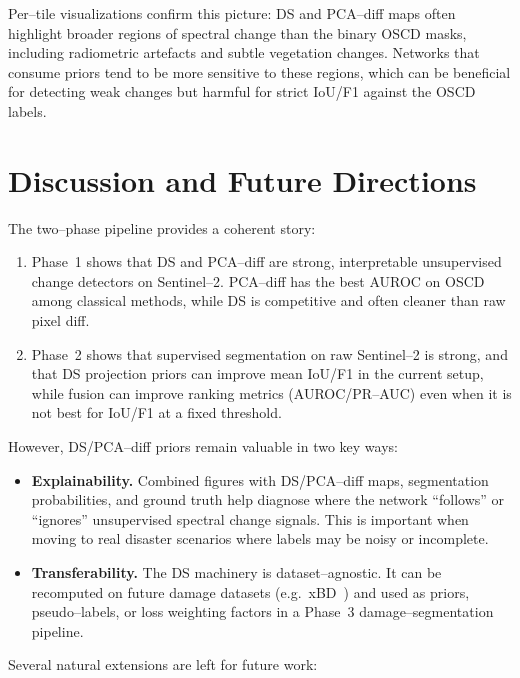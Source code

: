 \documentclass[twoside,11pt]{article}
\begin{document}
Per--tile visualizations confirm this picture: DS and PCA--diff maps often
highlight broader regions of spectral change than the binary OSCD masks,
including radiometric artefacts and subtle vegetation changes. Networks that
consume priors tend to be more sensitive to these regions, which can be
beneficial for detecting weak changes but harmful for strict IoU/F1 against
the OSCD labels.

\section{Discussion and Future Directions}

The two--phase pipeline provides a coherent story:

\begin{enumerate}
  \item Phase~1 shows that DS and PCA--diff are strong, interpretable
  unsupervised change detectors on Sentinel--2. PCA--diff has the best AUROC
  on OSCD among classical methods, while DS is competitive and often cleaner
  than raw pixel diff.
  \item Phase~2 shows that supervised segmentation on raw Sentinel--2 is
  strong, and that DS projection priors can improve mean IoU/F1 in the current
  setup, while fusion can improve ranking metrics (AUROC/PR--AUC) even when it
  is not best for IoU/F1 at a fixed threshold.
\end{enumerate}

However, DS/PCA--diff priors remain valuable in two key ways:

\begin{itemize}
  \item \textbf{Explainability.} Combined figures with DS/PCA--diff maps,
  segmentation probabilities, and ground truth help diagnose where the network
  ``follows'' or ``ignores'' unsupervised spectral change signals. This is
  important when moving to real disaster scenarios where labels may be noisy
  or incomplete.
  \item \textbf{Transferability.} The DS machinery is dataset--agnostic. It can
  be recomputed on future damage datasets (e.g.\ xBD~\cite{Gupta2019xBD}) and
  used as priors, pseudo--labels, or loss weighting factors in a Phase~3
  damage--segmentation pipeline.
\end{itemize}

Several natural extensions are left for future work:
\end{document}
